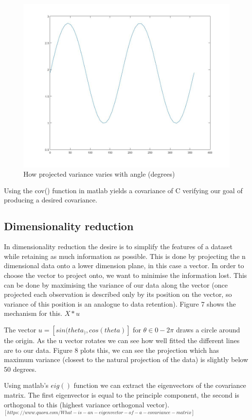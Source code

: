 \documentclass[10pt]{article}
\begin{document}
\begin{figure}[!h]
\begin{minipage}[b]{0.3\textwidth}
     \includegraphics[width=\textwidth]{variance.jpg}
     \caption{How projected variance varies with angle (degrees)}
  \end{minipage}
\end{figure}

Using the cov() function in matlab yields a covariance of C verifying our goal of producing a desired covariance.

\subsection{Dimensionality reduction}  
In dimensionality reduction the desire is to simplify the features of a dataset while retaining as much information as possible. This is done by projecting the n dimensional data onto a lower dimension plane, in this case a vector. In order to choose the vector to project onto, we want to minimise the information lost. This can be done by maximising the variance of our data along the vector (once projected each observation is described only by its position on the vector, so variance of this position is an analogue to data retention). Figure 7 shows the mechanism for this. $ X*u $

The vector $u = [sin(theta_), cos(theta)]$ for $\theta \in {0-2\pi}$ draws a circle around the origin. As the u vector rotates we can see how well fitted the different lines are to our data. Figure 8 plots this, we can see the projection which has maximum variance (closest to the natural projection of the data) is slightly below 50 degrees. 

Using matlab's $eig()$ function we can extract the eigenvectors of the covariance matrix. The first eigenvector is equal to the principle component, the second is orthogonal to this (highest variance orthogonal vector). \\ $^{[https://www.quora.com/What-is-an-eigenvector-of-a-covariance-matrix]}$


\end{document}

